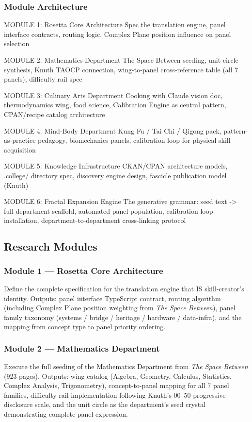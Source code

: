 \documentclass[11pt,letterpaper]{article}
\begin{document}
\subsubsection{Module Architecture}

\begin{asciibox}
MODULE 1: Rosetta Core Architecture
  Spec the translation engine, panel interface contracts, routing logic,
  Complex Plane position influence on panel selection

MODULE 2: Mathematics Department
  The Space Between seeding, unit circle synthesis, Knuth TAOCP connection,
  wing-to-panel cross-reference table (all 7 panels), difficulty rail spec

MODULE 3: Culinary Arts Department
  Cooking with Claude vision doc, thermodynamics wing, food science,
  Calibration Engine as central pattern, CPAN/recipe catalog architecture

MODULE 4: Mind-Body Department
  Kung Fu / Tai Chi / Qigong pack, pattern-as-practice pedagogy,
  biomechanics panels, calibration loop for physical skill acquisition

MODULE 5: Knowledge Infrastructure
  CKAN/CPAN architecture models, .college/ directory spec,
  discovery engine design, fascicle publication model (Knuth)

MODULE 6: Fractal Expansion Engine
  The generative grammar: seed text -> full department scaffold,
  automated panel population, calibration loop installation,
  department-to-department cross-linking protocol
\end{asciibox}

\subsection{Research Modules}

\subsubsection{Module 1 --- Rosetta Core Architecture}
Define the complete specification for the translation engine that IS skill-creator's identity. Outputs: panel interface TypeScript contract, routing algorithm (including Complex Plane position weighting from \textit{The Space Between}), panel family taxonomy (systems / bridge / heritage / hardware / data-infra), and the mapping from concept type to panel priority ordering.

\subsubsection{Module 2 --- Mathematics Department}
Execute the full seeding of the Mathematics Department from \textit{The Space Between} (923 pages). Outputs: wing catalog (Algebra, Geometry, Calculus, Statistics, Complex Analysis, Trigonometry), concept-to-panel mapping for all 7 panel families, difficulty rail implementation following Knuth's 00--50 progressive disclosure scale, and the unit circle as the department's seed crystal demonstrating complete panel expression.
\end{document}
